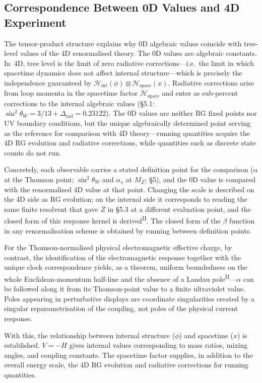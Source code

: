 \documentclass[12pt,a4paper]{article}
\newcommand{\PII}{\textsuperscript{\textup{II}}}
\begin{document}
\medskip
\subsection{Correspondence Between 0D Values and 4D Experiment}\label{sec:correspondence}

The tensor-product structure explains why 0D algebraic values
coincide with tree-level values of the 4D renormalised theory.
The 0D values are algebraic constants. In~4D, tree level is the limit of zero radiative
corrections---i.e.\ the limit in which spacetime dynamics does not
affect internal structure---which is precisely the independence
guaranteed by $\mathcal{H}_\mathrm{int}(\phi) \otimes \mathcal{H}_\mathrm{space}(x)$.
Radiative corrections arise from loop momenta in the spacetime
factor $\mathcal{H}_\mathrm{space}$ and enter as sub-percent corrections to the internal
algebraic values (\S5.1: $\sin^2\!\theta_W = 3/13 + \Delta_\mathrm{rad} = 0.23122$).
The 0D values are neither RG fixed points nor UV boundary conditions, but the unique algebraically determined point serving as the reference for comparison with 4D theory---running quantities acquire the 4D RG evolution and radiative corrections, while quantities such as discrete state counts do not run.

Concretely, each observable carries a stated definition point for the
comparison ($\alpha$ at the Thomson point; $\sin^2\!\theta_W$ and
$\alpha_s$ at $M_Z$; \S5), and the 0D value is compared with the
renormalised 4D value at that point. Changing the scale is described
on the 4D side as RG evolution; on the internal side it corresponds
to reading the same finite resolvent that gave $Z$ in \S5.3 at a
different evaluation point, and the closed form of this response
kernel is derived\PII{}. The closed form of the $\beta$
function in any renormalisation scheme is obtained by running between definition points.

For the Thomson-normalised
physical electromagnetic effective charge, by contrast, the
identification of the electromagnetic response together with the unique clock correspondence yields, as a theorem, uniform boundedness
on the whole Euclidean-momentum half-line and the absence of a Landau
pole\PII{}---$\alpha$ can be followed along it from its Thomson-point
value to a finite ultraviolet value. Poles appearing in perturbative
displays are coordinate singularities created by a singular
reparametrisation of the coupling, not poles of the physical current
response.

With this, the relationship between internal structure ($\phi$) and spacetime ($x$) is established. $V = -H$ gives internal values corresponding to mass ratios, mixing angles, and coupling constants. The spacetime factor supplies, in addition to the overall energy scale, the 4D RG evolution and radiative corrections for running quantities.
\end{document}
